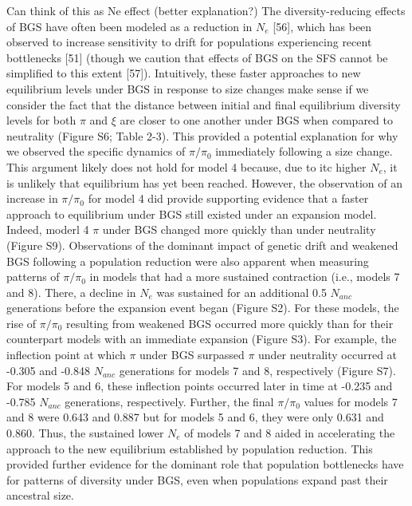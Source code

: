 \documentclass[9pt,twocolumn,twoside]{rilabRxiv}
\begin{document}
Can think of this as Ne effect (better explanation?)
The diversity-reducing effects of BGS have often been modeled as a reduction in $N_e$ [56], which has been observed to increase sensitivity to drift for populations experiencing recent bottlenecks [51] (though we caution that effects of BGS on the SFS cannot be simplified to this extent [57]).
 Intuitively, these faster approaches to new equilibrium levels under BGS in response to size changes make sense if we consider the fact that the distance between initial and final equilibrium diversity levels for both $\pi$ and $\xi$ are closer to one another  under BGS when compared to neutrality (Figure S6; Table 2-3). 
This  provided a potential explanation for why we observed the specific dynamics of $\pi/\pi_0$ immediately following a size change.
This argument likely does not hold for model 4 because, due to itc higher $N_e$, it is unlikely that equilibrium has yet been reached. However, the observation of an increase in $\pi/\pi_0$ for model 4 did provide supporting evidence that a
 faster approach to equilibrium under BGS still existed under an
 expansion model. 
 Indeed, moderl 4 $\pi$ under BGS changed more quickly than
 under neutrality (Figure S9).
Observations of the dominant impact of genetic drift and weakened BGS
following a population reduction were also apparent when measuring
patterns of $\pi/\pi_0$ in models that had a more sustained
contraction (i.e., models 7 and 8). There, a decline in
$N_e$ was sustained for an additional 0.5
$N_{anc}$ generations before the expansion event began
(Figure S2). For these models, the rise of $\pi/\pi_0$
resulting from weakened BGS occurred more quickly than for their
counterpart models with an immediate expansion (Figure S3). For example,
the inflection point at which $\pi$ under BGS surpassed $\pi$ under neutrality
occurred at -0.305 and -0.848 $N_{anc}$ generations
for models 7 and 8, respectively (Figure S7). For models 5 and 6, these
inflection points occurred later in time at -0.235 and -0.785
$N_{anc}$ generations, respectively. Further, the
final $\pi/\pi_0$ values for models 7 and 8 were 0.643 and
0.887 but for models 5 and 6, they were only 0.631 and 0.860. Thus, the
sustained lower $N_e$ of models 7 and 8 aided in
accelerating the approach to the new equilibrium established by
population reduction. This provided further evidence for the dominant
role that population bottlenecks have for patterns of diversity under
BGS, even when populations expand past their ancestral size.
\end{document}
